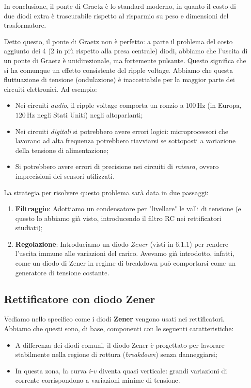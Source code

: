 In conclusione, il ponte di Graetz è lo standard moderno, in quanto il costo di due diodi extra è trascurabile rispetto al risparmio su peso e dimensioni del trasformatore.

Detto questo, il ponte di Graetz non è perfetto: a parte il problema del costo aggiunto dei 4 (2 in più rispetto alla presa centrale) diodi, abbiamo che l’uscita di un ponte di Graetz è unidirezionale, ma fortemente pulsante. Questo significa che si ha comunque un effetto consistente del ripple voltage. Abbiamo che questa fluttuazione di tensione (ondulazione) è inaccettabile per la maggior parte dei circuiti elettronici. Ad esempio:

\begin{itemize}
	\item Nei circuiti \textit{audio}, il ripple voltage comporta un ronzio a $100 \, \mathrm{Hz}$ (in Europa, $120 \, \mathrm{Hz}$ negli Stati Uniti) negli altoparlanti;
	\item Nei circuiti \textit{digitali} si potrebbero avere errori logici: microprocessori che lavorano ad alta frequenza potrebbero riavviarsi se sottoposti a variazione della tensione di alimentazione;
	\item Si potrebbero avere errori di precisione nei circuiti di \textit{misura}, ovvero imprecisioni dei sensori utilizzati.
\end{itemize}

La strategia per risolvere questo problema sarà data in due passaggi:
\begin{enumerate}
	\item \textbf{Filtraggio}: Adottiamo un condensatore per "livellare" le valli di tensione (e questo lo abbiamo già visto, introducendo il filtro RC nei rettificatori studiati);
	\item \textbf{Regolazione}: Introduciamo un diodo \textit{Zener} (visti in 6.1.1) per rendere l’uscita immune alle variazioni del carico. Avevamo già introdotto, infatti, come un diodo di Zener in regime di breakdown può comportarsi come un generatore di tensione costante.
\end{enumerate}

\subsection{Rettificatore con diodo Zener}
Vediamo nello specifico come i diodi \textbf{Zener} vengono usati nei rettificatori. Abbiamo che questi sono, di base, componenti con le seguenti caratteristiche:
\begin{itemize}
    \item A differenza dei diodi comuni, il diodo Zener è progettato per lavorare stabilmente nella regione di rottura (\textit{breakdown}) senza danneggiarsi;
	\item In questa zona, la curva $i\text{-}v$ diventa quasi verticale: grandi variazioni di corrente corrispondono a variazioni minime di tensione.
\end{itemize}

